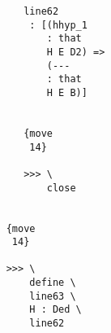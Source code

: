\documentclass[12pt]{article}
\begin{document}
\begin{verbatim}
                                             line62 
                                              : [(hhyp_1 
                                                 : that 
                                                 H E D2) => 
                                                 (--- 
                                                 : that 
                                                 H E B)]


                                             {move 
                                              14}

                                             >>> \
                                                 close


                                          {move 
                                           14}

                                          >>> \
                                              define \
                                              line63 \
                                              H : Ded \
                                              line62



\end{verbatim}
\end{document}
